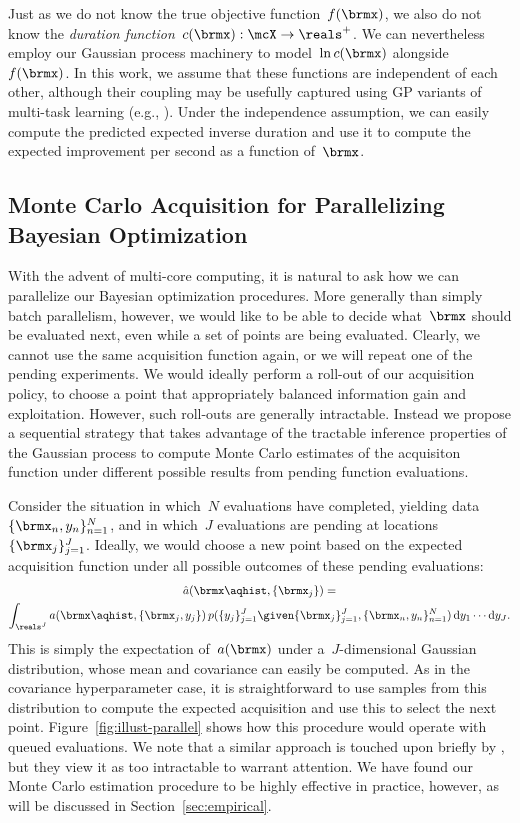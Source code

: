 \documentclass[aos,preprint]{imsart}
\begin{document}
Just as we do not know the true objective function~$f(\brmx)$, we also
do not know the \emph{duration
  function}~${c(\brmx):\mcX\to\reals^{+}}$.  We can nevertheless
employ our Gaussian process machinery to model~$\ln c(\brmx)$
alongside~$f(\brmx)$.  In this work, we assume that these functions
are independent of each other, although their coupling may be usefully
captured using GP variants of multi-task learning (e.g., \citet{teh-etal-2005a,bonilla-etal-2008a}).
Under the independence assumption, we can easily compute the predicted
expected inverse duration and use it to compute the expected
improvement per second as a function of~$\brmx$.

\subsection{Monte Carlo Acquisition for Parallelizing Bayesian Optimization}
With the advent of multi-core computing, it is natural to ask how we
can parallelize our Bayesian optimization procedures.  More generally
than simply batch parallelism, however, we would like to be able to
decide what~$\brmx$ should be evaluated next, even while a set of
points are being evaluated.  Clearly, we cannot use the same
acquisition function again, or we will repeat one of the pending
experiments.  We would ideally perform a roll-out of our acquisition
policy, to choose a point that appropriately balanced information gain
and exploitation.  However, such roll-outs are generally intractable.
Instead we propose a sequential strategy that takes advantage of the
tractable inference properties of the Gaussian process to compute
Monte Carlo estimates of the acquisiton function under different
possible results from pending function evaluations.

Consider the situation in which~$N$ evaluations have completed,
yielding data~$\{\brmx_n,y_n\}^N_{n=1}$, and in which~$J$ evaluations
are pending at locations~$\{\brmx_j\}^J_{j=1}$.  Ideally, we would
choose a new point based on the expected acquisition function under
all possible outcomes of these pending evaluations:
\begin{multline}
  \hat{a}(\brmx\aqhist,\{\brmx_j\}) = \\\int_{\reals^J}
  a(\brmx\aqhist,\{\brmx_j,y_j\})\,p(\{y_j\}^J_{j=1}
  \given\{\brmx_j\}^J_{j=1},\{\brmx_n,y_n\}^N_{n=1})
  \,
  \mathrm{d}y_1\cdots\mathrm{d}y_J.
\end{multline}
This is simply the expectation of~$a(\brmx)$ under a~$J$-dimensional
Gaussian distribution, whose mean and covariance can easily be
computed.  As in the covariance hyperparameter case, it is
straightforward to use samples from this distribution to compute the
expected acquisition and use this to select the next point.
Figure~\ref{fig:illust-parallel} shows how this procedure would
operate with queued evaluations.  We note that a similar approach is
touched upon briefly by \citet{Ginsbourger2010a}, but they view it as
too intractable to warrant attention.  We have found our Monte Carlo
estimation procedure to be highly effective in practice, however, as
will be discussed in Section~\ref{sec:empirical}.
\end{document}
